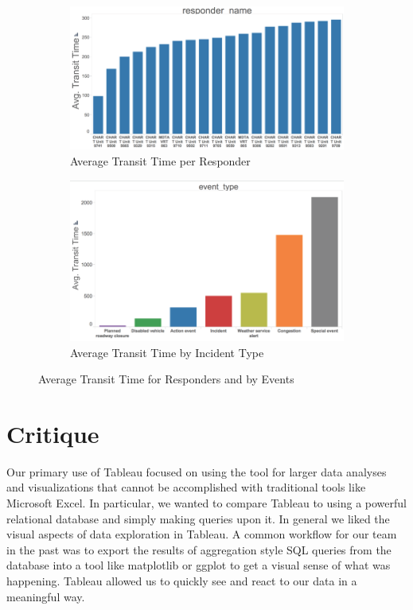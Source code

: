 \documentclass[11pt,letterpaper]{article}
\begin{document}
\begin{figure}[h]
	\centering
	\begin{subfigure}{0.49\textwidth}
		\centering
		\includegraphics[width=\textwidth]{figures/transit_time_responder.png}
		\caption{\textsf{Average Transit Time per Responder}}
        \label{fig:transit_time_responder}
	\end{subfigure} \hfill
	\begin{subfigure}{0.49\textwidth}
		\centering
		\includegraphics[width=\textwidth]{figures/transit_time_event.png}
		\caption{Average Transit Time by Incident Type}
        \label{fig:transit_time_event}
	\end{subfigure}
    \caption{\textsf{Average Transit Time for Responders and by Events}}
    \label{fig:transit_time}
\end{figure}

\section*{Critique}

Our primary use of Tableau focused on using the tool for larger data analyses and visualizations that cannot be accomplished with traditional tools like Microsoft Excel. In particular, we wanted to compare Tableau to using a powerful relational database and simply making queries upon it. In general we liked the visual aspects of data exploration in Tableau. A common workflow for our team in the past was to export the results of aggregation style SQL queries from the database into a tool like matplotlib or ggplot to get a visual sense of what was happening. Tableau allowed us to quickly see and react to our data in a meaningful way. 
\end{document}
